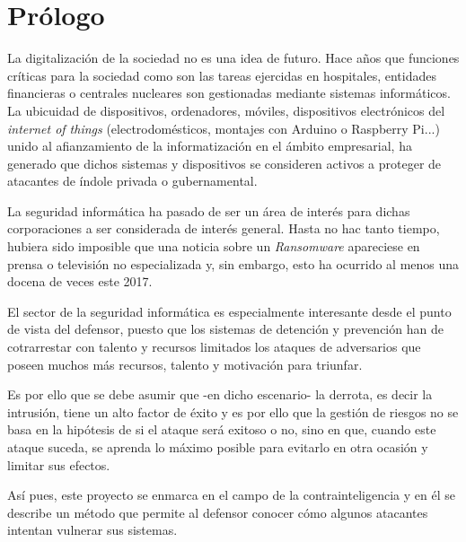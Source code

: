 
\chapter{Prólogo}

La digitalización de la sociedad no es una idea de futuro. Hace años que funciones críticas para la sociedad
como son las tareas ejercidas en hospitales, entidades financieras o centrales nucleares son gestionadas mediante sistemas informáticos. 
La ubicuidad de dispositivos, ordenadores, móviles, dispositivos electrónicos del \emph{internet of things}
(electrodomésticos, montajes con Arduino o Raspberry Pi...) unido al afianzamiento de la informatización en el ámbito empresarial, ha generado
que dichos sistemas y dispositivos se consideren activos a proteger de atacantes de índole privada o gubernamental.

La seguridad informática ha pasado de ser un área de interés para dichas corporaciones a ser considerada de interés general.
Hasta no hac tanto tiempo, hubiera sido imposible que una noticia sobre un \emph{Ransomware} apareciese en prensa o televisión no especializada y, sin embargo, esto ha ocurrido
al menos una docena de veces este 2017.

El sector de la seguridad informática es especialmente interesante desde el punto de vista del defensor, puesto que
los sistemas de detención y prevención han de cotrarrestar con talento y recursos limitados los ataques de adversarios
que poseen muchos más recursos, talento y motivación para triunfar.

Es por ello que se debe asumir que -en dicho escenario- la derrota, es decir la intrusión, tiene un alto factor de éxito y es 
por ello que la gestión de riesgos no se basa en la hipótesis de si el ataque será exitoso o no, sino en que, cuando
este ataque suceda, se aprenda lo máximo posible para evitarlo en otra ocasión y limitar sus efectos.

Así pues, este proyecto se enmarca en el campo de la contrainteligencia y en él se describe un método que permite al defensor conocer cómo algunos atacantes intentan vulnerar sus sistemas. 






